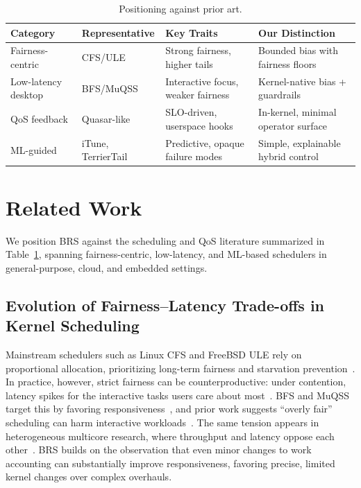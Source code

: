 \begin{table}[t] \centering \caption{Positioning against prior art.} \label{tab:rw_compare} \begin{tabular}{llll} \toprule \textbf{Category} & \textbf{Representative} & \textbf{Key Traits} & \textbf{Our Distinction} \\ \midrule Fairness-centric & CFS/ULE & Strong fairness, higher tails & Bounded bias with fairness floors \\ Low-latency desktop & BFS/MuQSS & Interactive focus, weaker fairness & Kernel-native bias + guardrails \\ QoS feedback & Quasar-like & SLO-driven, userspace hooks & In-kernel, minimal operator surface \\ ML-guided & iTune, TerrierTail & Predictive, opaque failure modes & Simple, explainable hybrid control \\ \bottomrule \end{tabular} \end{table}

\section{Related Work}
\label{sec:related}
We position BRS against the scheduling and QoS literature summarized in Table~\ref{tab:rw_compare}, spanning fairness-centric, low-latency, and ML-based schedulers in general-purpose, cloud, and embedded settings.

\subsection{Evolution of Fairness--Latency Trade-offs in Kernel Scheduling}
Mainstream schedulers such as Linux CFS and FreeBSD ULE rely on proportional allocation, prioritizing long-term fairness and starvation prevention~\cite{241774,4624248,67577}. In practice, however, strict fairness can be counterproductive: under contention, latency spikes for the interactive tasks users care about most~\cite{4663063,6365626}. BFS and MuQSS target this by favoring responsiveness~\cite{10306992}, and prior work suggests ``overly fair'' scheduling can harm interactive workloads~\cite{Bouron2018Battle}. The same tension appears in heterogeneous multicore research, where throughput and latency oppose each other~\cite{8360522,6899614}. BRS builds on the observation that even minor changes to work accounting can substantially improve responsiveness, favoring precise, limited kernel changes over complex overhauls.

